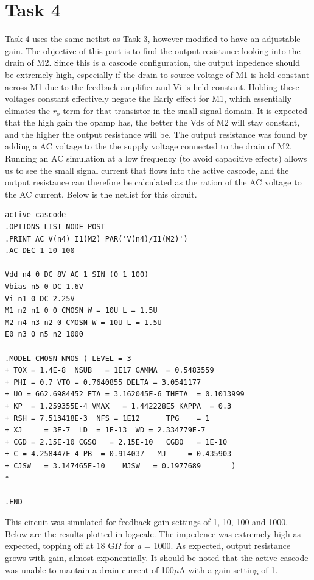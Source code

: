 \documentclass[12pt]{article}
\begin{document}
\section*{Task 4}
Task 4 uses the same netlist as Task 3, however modified to have an adjustable gain. The objective of this part is to find the output resistance looking into the drain of M2. Since this is a cascode configuration, the output inpedence should be extremely high, especially if the drain to source voltage of M1 is held constant across M1 due to the feedback amplifier and Vi is held constant. Holding these voltages constant effectively negate the Early effect for M1, which essentially elimates the $r_o$ term for that transistor in the small signal domain. It is expected that the high gain the opamp has, the better the Vds of M2 will stay constant, and the higher the output resistance will be. The output resistance was found by adding a AC voltage to the the supply voltage connected to the drain of M2. Running an AC simulation at a low frequency (to avoid capacitive effects) allows us to see the small signal current that flows into the active cascode, and the output resistance can therefore be calculated as the ration of the AC voltage to the AC current. Below is the netlist for this circuit.
\begin{lstlisting}
active cascode
.OPTIONS LIST NODE POST 
.PRINT AC V(n4) I1(M2) PAR('V(n4)/I1(M2)')
.AC DEC 1 10 100

Vdd n4 0 DC 8V AC 1 SIN (0 1 100)
Vbias n5 0 DC 1.6V
Vi n1 0 DC 2.25V 
M1 n2 n1 0 0 CMOSN W = 10U L = 1.5U
M2 n4 n3 n2 0 CMOSN W = 10U L = 1.5U
E0 n3 0 n5 n2 1000

.MODEL CMOSN NMOS ( LEVEL = 3 
+ TOX = 1.4E-8  NSUB   = 1E17 GAMMA  = 0.5483559          
+ PHI = 0.7 VTO = 0.7640855 DELTA = 3.0541177 
+ UO = 662.6984452 ETA = 3.162045E-6 THETA  = 0.1013999          
+ KP  = 1.259355E-4 VMAX   = 1.442228E5 KAPPA  = 0.3             
+ RSH = 7.513418E-3  NFS = 1E12      TPG    = 1                     
+ XJ     = 3E-7  LD  = 1E-13  WD = 2.334779E-7
+ CGD = 2.15E-10 CGSO   = 2.15E-10   CGBO   = 1E-10        
+ C = 4.258447E-4 PB  = 0.914037   MJ     = 0.435903 
+ CJSW   = 3.147465E-10    MJSW   = 0.1977689       )                                     
*

.END
\end{lstlisting}
This circuit was simulated for feedback gain settings of 1, 10, 100 and 1000. Below are the results plotted in logscale. The impedence was extremely high as expected, topping off at 18 G$\Omega$ for \textit{a} = 1000. As expected, output resistance grows with gain, almost exponentially. It should be noted that the active cascode was unable to mantain a drain current of 100$\mu$A  with a gain setting of 1. \\
\end{document}
